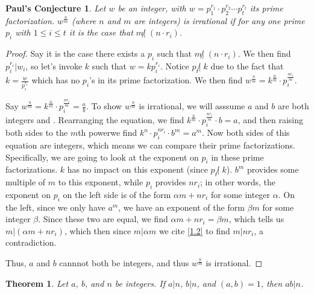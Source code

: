 \documentclass{article}
\newtheorem{thm}{Theorem}[section]
\newtheorem{PC}{Paul's Conjecture}
\numberwithin{equation}{thm}
\begin{document}
\begin{PC} \label{PC 2.24}
  Let $w$ be an integer, with $w = p_1^{r_1} \cdot p_2^{r_2} \cdots p_t^{r_t}$ its prime factorization. $w^{\frac n m}$ (where $n$ and $m$ are integers) is irrational if for any one prime $p_i$ with $1 \leq i \leq t$ it is the case that $m \not | \; (n \cdot r_i)$.
\end{PC}

\begin{proof}
  Say it is the case there exists a $p_i$ such that $m \not | \; (n \cdot r_i)$. We then find $p_i^{r_i} | w_i$, so let's invoke $k$ such that $w = kp_i^{r_i}$. Notice $p_i \not | \; k$ due to the fact that $k = \frac{w}{p_i^{r_i}}$ which has no $p_i$'s in its prime factorization. We then find $w ^ {\frac n m} = k^{\frac n m} \cdot p_i ^ {\frac{nr_i}{m}}$.

  Say $w^{\frac n m} = k^{\frac n m} \cdot p_i^{\frac{nr_i}{m}} = \frac{a}{b}$. To show $w^{\frac n m}$ is irrational, we will asssume $a$ and $b$ are both integers and . Rearranging the equation, we find $k^{\frac n m} \cdot p_i^{\frac{nr_i}{m}} \cdot b = a$, and then raising both sides to the $m$th powerwe find $k^n \cdot p_i^{nr_i} \cdot b^m = a^m$.
  Now both sides of this equation are integers, which means we can compare their prime factorizations. Specifically, we are going to look at the exponent on $p_i$ in these prime factorizations. $k$ has no impact on this exponent (since $p_i \not | \; k$). $b^m$ provides some multiple of $m$ to this exponent, while $p_i$ provides $nr_i$; in other words, the exponent on $p_i$ on the left side is of the form $\alpha m + nr_i$ for some integer $\alpha$. On the left, since we only have $a^m$, we have an exponent of the form $\beta m$ for some integer $\beta$. Since these two are equal, we find $\alpha m + nr_i = \beta m$, which tells us $m | (\alpha m + nr_i)$, which then since $m | \alpha m$ we cite \ref{1.2} to find $m | nr_i$, a contradiction.

  Thus, $a$ and $b$ cannnot both be integers, and thus $w^{\frac n m}$ is irrational.
\end{proof}



\begin{thm} \label{2.25}
  Let $a$, $b$, and $n$ be integers. If $a|n$, $b|n$, and $(a, b) = 1$, then $ab | n$.
\end{thm}
\end{document}

